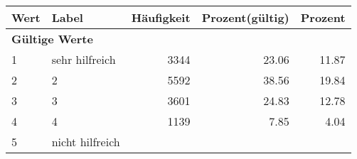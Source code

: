      \begin{longtable}{lXrrr}
     \toprule
     \textbf{Wert} & \textbf{Label} & \textbf{Häufigkeit} & \textbf{Prozent(gültig)} & \textbf{Prozent} \\
     \endhead
     \midrule
     \multicolumn{5}{l}{\textbf{Gültige Werte}}\\

     1 &
     \multicolumn{1}{X}{ sehr hilfreich   } &


       \num{3344} &
       \num[round-mode=places,round-precision=2]{23.06} &
         \num[round-mode=places,round-precision=2]{11.87} \\

     2 &
     \multicolumn{1}{X}{ 2   } &


       \num{5592} &
       \num[round-mode=places,round-precision=2]{38.56} &
         \num[round-mode=places,round-precision=2]{19.84} \\

     3 &
     \multicolumn{1}{X}{ 3   } &


       \num{3601} &
       \num[round-mode=places,round-precision=2]{24.83} &
         \num[round-mode=places,round-precision=2]{12.78} \\

     4 &
     \multicolumn{1}{X}{ 4   } &


       \num{1139} &
       \num[round-mode=places,round-precision=2]{7.85} &
         \num[round-mode=places,round-precision=2]{4.04} \\

     5 &
     \multicolumn{1}{X}{ nicht hilfreich   } &



\end{longtable}
